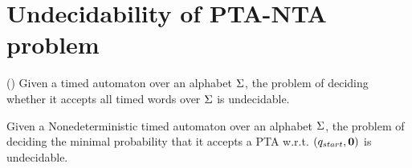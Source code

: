 \section{Undecidability of PTA-NTA problem}
\begin{lemma}{(\cite{DBLP:conf/tapsoft/Vaandrager97})}
Given a timed automaton over an alphabet $\Sigma$, the problem of deciding whether it accepts all timed words over $\Sigma$ is undecidable.
\end{lemma}

\begin{proposition}
Given a Nonedeterministic timed automaton over an alphabet $\Sigma$, the problem of deciding 
the minimal probability that it accepts a PTA w.r.t. $(q_{start},\mathbf{0})$ is undecidable.
\end{proposition}

